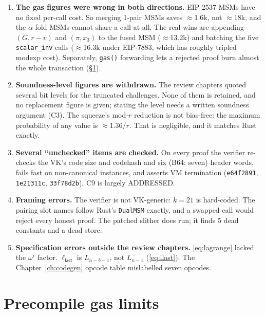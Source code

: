 \begin{enumerate}[leftmargin=1.6em,itemsep=3pt]
  unused opcodes are not rendered and fall into the \texttt{default}
  revert. The real question is whether \emph{this exact program} has been
  differentially tested (\S\ref{sec:pr-isa-dispatch}).
\item \textbf{The gas figures were wrong in both directions.}
  EIP-2537 MSMs have no fixed per-call cost. So merging 1-pair MSMs saves
  $\approx$1.6k, not $\approx$18k, and the $\alpha$-fold MSMs cannot share
  a call at all. The real wins are appending $(G, r-v)$ and $(\pi, x_3)$ to
  the fused MSM ($\approx$13.2k) and batching the five
  \texttt{scalar\_inv} calls ($\approx$16.3k under EIP-7883, which has
  roughly tripled modexp cost). Separately, \texttt{gas()} forwarding
  lets a rejected proof burn almost the whole transaction
  (\S\ref{sec:vp-gas-bounds}).
\item \textbf{Soundness-level figures are withdrawn.} The review
  chapters quoted several bit levels for the truncated challenges.
  None of them is retained, and no replacement figure is given; stating
  the level needs a
  written soundness argument (C3). The squeeze's mod-$r$
  reduction is not bias-free: the maximum probability of any value is
  $\approx 1.36/r$. That is negligible, and it matches Rust exactly.
\item \textbf{Several ``unchecked'' items are checked.} On every proof the
  verifier re-checks the VK's code size and codehash and six (B64: seven)
  header words, fails fast on non-canonical instances, and asserts VM
  termination (\texttt{e64f2891}, \texttt{1e21311c}, \texttt{33f78d2b}).
  C9 is largely ADDRESSED.
\item \textbf{Framing errors.} The verifier is not VK-generic: $k=21$ is
  hard-coded. The pairing slot names follow Rust's \texttt{DualMSM}
  exactly, and a swapped call would reject every honest proof. The patched
  slither does run; it finds 5 dead constants and a dead store.
\item \textbf{Specification errors outside the review chapters.}
  \eqref{eq:lagrange} lacked the $\omega^i$ factor.
  $\ell_\mathsf{last}$ is $L_{n-b-1}$, not $L_{n-1}$ (\eqref{eq:llast}).
  The Chapter~\ref{ch:codegen} opcode table mislabelled seven opcodes.
\end{enumerate}

\section{Precompile gas limits}
\label{sec:vp-gas-bounds}

